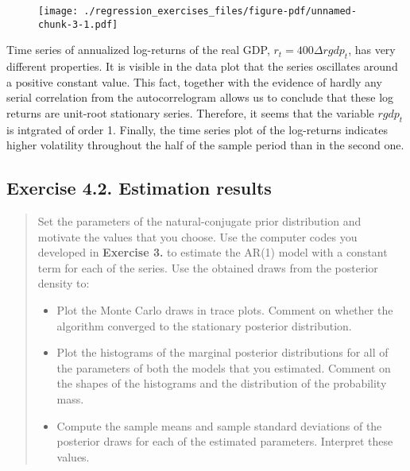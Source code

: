 \documentclass[
  letterpaper,
  DIV=11,
  numbers=noendperiod]{scrreprt}
\providecommand{\tightlist}{%
  \setlength{\itemsep}{0pt}\setlength{\parskip}{0pt}}\usepackage{longtable,booktabs,array}
\begin{document}
\begin{figure}[H]

{\centering \texttt{[image: ./regression\_exercises\_files/figure-pdf/unnamed-chunk-3-1.pdf]}

}

\end{figure}

Time series of annualized log-returns of the real GDP,
\(r_t = 400\Delta rgdp_t\), has very different properties. It is visible
in the data plot that the series oscillates around a positive constant
value. This fact, together with the evidence of hardly any serial
correlation from the autocorrelogram allows us to conclude that these
log returns are unit-root stationary series. Therefore, it seems that
the variable \(rgdp_t\) is intgrated of order 1. Finally, the time
series plot of the log-returns indicates higher volatility throughout
the half of the sample period than in the second one.

\hypertarget{exercise-4.2.-estimation-results}{%
\subsection*{Exercise 4.2. Estimation
results}\label{exercise-4.2.-estimation-results}}

\begin{quote}
Set the parameters of the natural-conjugate prior distribution and
motivate the values that you choose. Use the computer codes you
developed in \textbf{Exercise 3.} to estimate the AR(1) model with a
constant term for each of the series. Use the obtained draws from the
posterior density to:

\begin{itemize}
\tightlist
\item
  Plot the Monte Carlo draws in trace plots. Comment on whether the
  algorithm converged to the stationary posterior distribution.
\item
  Plot the histograms of the marginal posterior distributions for all of
  the parameters of both the models that you estimated. Comment on the
  shapes of the histograms and the distribution of the probability mass.
\item
  Compute the sample means and sample standard deviations of the
  posterior draws for each of the estimated parameters. Interpret these
  values.
\end{itemize}
\end{quote}
\end{document}
